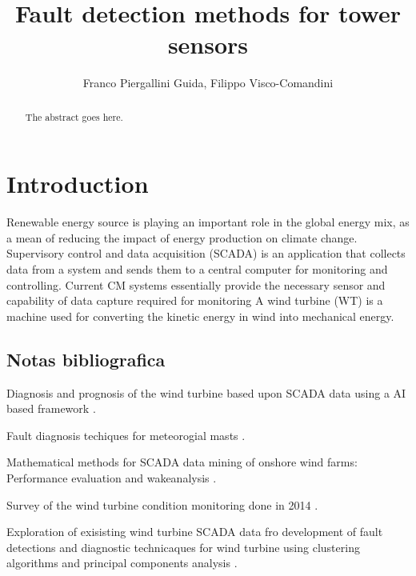 \documentclass[journal]{IEEEtran}
\begin{document}
\title{Fault detection methods for tower sensors}

\author{Franco Piergallini Guida, Filippo Visco-Comandini}%



\maketitle

\begin{abstract}
The abstract goes here.
\end{abstract}
\section{Introduction}
Renewable energy source is playing an important role in the global energy mix, as a mean of reducing the impact of energy production on climate change. \\
Supervisory control and data acquisition (SCADA) is an application that collects data from a system and sends them to a central computer for monitoring and controlling. Current CM systems essentially provide the necessary sensor and capability of data capture required for monitoring
A wind turbine (WT) is a machine used for converting the kinetic energy in wind into mechanical energy. 
\subsection{Notas bibliografica}
Diagnosis and prognosis of the wind turbine based upon SCADA data using a AI based framework \cite{wang2014scada}.

Fault diagnosis techiques for meteorogial masts \cite{hasu2006weather}  .

Mathematical methods for SCADA data mining of onshore wind farms: Performance evaluation and wakeanalysis \cite{astolfi2016mathematical}.


\cite{kusiak2011prediction}

\cite{lu2009review}

\cite{schlechtingen2012condition}

\cite{schlechtingen2011comparative}

\cite{yang2014wind}
Survey of the wind turbine condition monitoring done in 2014 \cite{tchakoua2014wind}.


\cite{wymore2015survey}

Exploration of exisisting wind turbine SCADA data fro development of fault detections and diagnostic technicaques for wind turbine using clustering algorithms and principal components analysis \cite{kim2011use}.
\end{document}
